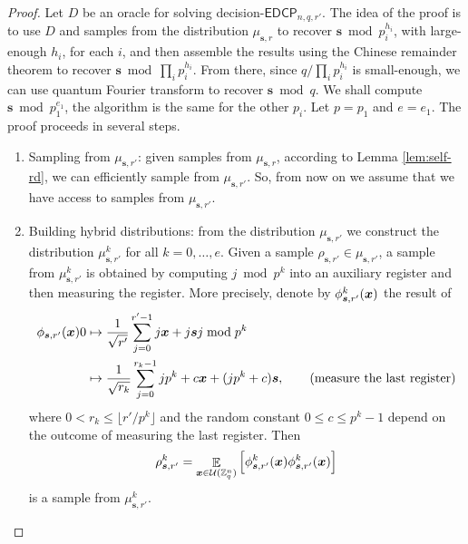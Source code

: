 \documentclass[11pt]{article}
\theoremstyle{plain}
\theoremstyle{definition}
\DeclareMathOperator{\E}{\mathbb{E}}
\let\ket\relax
\DeclarePairedDelimiter{\ket}{\lvert}{\rangle}
\let\bra\relax
\DeclarePairedDelimiter{\bra}{\langle}{\rvert}
\def\Z{\mathbb{Z}}
\def\edcp{\mathsf{EDCP}}
\def\U{\mathcal{U}}
\begin{document}
\begin{proof}
    Let $D$ be an oracle for solving decision-$\edcp_{n, q, r'}$. The idea of the proof is to use $D$ and samples from the distribution $\mu_{\bm{s}, r}$ to recover $\bm{s} \bmod p_i^{h_i}$, with large-enough $h_i$, for each $i$, and then assemble the results using the Chinese remainder theorem to recover $\bm{s} \bmod \prod_i p_i^{h_i}$. From there, since $q / \prod_i p_i^{h_i}$ is small-enough, we can use quantum Fourier transform to recover $\bm{s} \bmod q$. We shall compute $\bm{s} \bmod p_1^{e_1}$, the algorithm is the same for the other $p_i$. Let $p = p_1$ and $e = e_1$. The proof proceeds in several steps.

    \begin{enumerate}[leftmargin = *, font = \bfseries]
    \item Sampling from $\mu_{\bm{s}, r'}$: given samples from $\mu_{\bm{s}, r}$, according to Lemma \ref{lem:self-rd}, we can efficiently sample from $\mu_{\bm{s}, r'}$. So, from now on we assume that we have access to samples from $\mu_{\bm{s}, r'}$.

    \item Building hybrid distributions: from the distribution $\mu_{\bm{s}, r'}$ we construct the distribution $\mu_{\bm{s}, r'}^k$ for all $k = 0, \dots, e$. Given a sample $\rho_{\bm{s}, r'} \in \mu_{\bm{s}, r'}$, a sample from $\mu_{\bm{s}, r'}^k$ is obtained by computing $j \bmod p^k$ into an auxiliary register and then measuring the register. More precisely, denote by $\ket{\phi_{\bm{s}, r'}^k(\bm{x})}$ the result of 
    \begin{align}
        \ket{\phi_{\bm{s}, r'}(\bm{x})}\ket{0}
        & \mapsto \frac{1}{\sqrt{r'}} \sum_{j = 0}^{r' - 1} \ket{j}\ket{\bm{x} + j\bm{s}}\ket{j \bmod p^k} \label{equ:r-1}  \\
        & \mapsto \frac{1}{\sqrt{r_k}} \sum_{j = 0}^{r_k - 1} \ket{jp^k + c}\ket{\bm{x} + (jp^k + c)\bm{s}}, \nonumber \tag{measure the last register}
    \end{align}
    where $0 < r_k \le \lfloor r' / p^k \rfloor$ and the random constant $0 \le c \le p^k - 1$ depend on the outcome of measuring the last register. Then
    \[ \rho_{\bm{s}, r'}^k = \E_{\bm{x} \in \U(\Z_q^n)} \Big[ \ket{\phi_{\bm{s}, r'}^k(\bm{x})} \bra{\phi_{\bm{s}, r'}^k(\bm{x})} \Big] \]
    is a sample from $\mu_{\bm{s}, r'}^k$.
    

\end{enumerate}
\end{proof}
\end{document}
